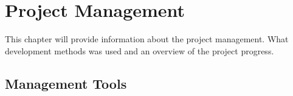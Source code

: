 \chapter{Project Management}
This chapter will provide information about the project management. What development methods was used and an overview of the project progress.
\newpage
\section{Management Tools}




